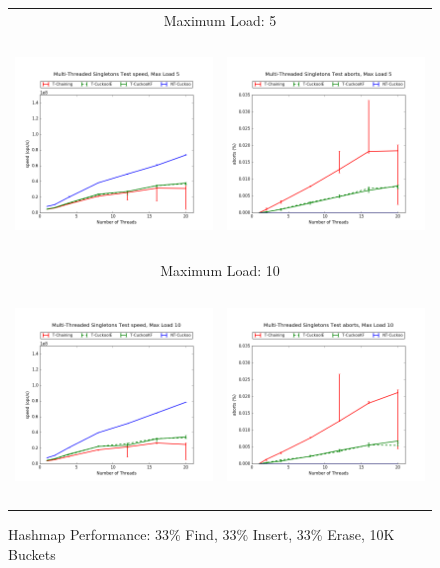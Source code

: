 \begin{figure}[h!]
    \centering
    \caption{Hashmap Performance: 33\% Find, 33\% Insert, 33\% Erase, 10K Buckets}
    \begin{tabular}{|cc|}
        \hline 
        \multicolumn{2}{|c|}{{\footnotesize Maximum Load: 5}}\\
        \includegraphics[height=2.25in]{maps/5HM10K:F34,I33,E33speed.png} &
        \includegraphics[height=2.25in]{maps/5HM10K:F34,I33,E33aborts.png}\\
        \hline 
        \multicolumn{2}{|c|}{{\footnotesize Maximum Load: 10}}\\
        \includegraphics[height=2.25in]{maps/10HM10K:F34,I33,E33speed.png} &
        \includegraphics[height=2.25in]{maps/10HM10K:F34,I33,E33aborts.png}\\

\end{tabular}
\end{figure}
